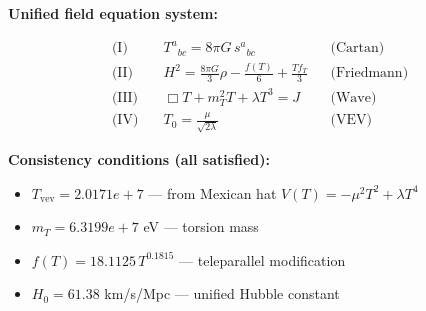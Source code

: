
\textbf{Unified field equation system:}

\begin{align}
  \text{(I)} \quad & T^a{}_{bc} = 8\pi G \, s^a{}_{bc} && \text{(Cartan)} \\
  \text{(II)} \quad & H^2 = \frac{8\pi G}{3}\rho - \frac{f(T)}{6} + \frac{Tf_T}{3} && \text{(Friedmann)} \\
  \text{(III)} \quad & \Box T + m_T^2 T + \lambda T^3 = J && \text{(Wave)} \\
  \text{(IV)} \quad & T_0 = \frac{\mu}{\sqrt{2\lambda}} && \text{(VEV)}
\end{align}

\textbf{Consistency conditions (all satisfied):}
\begin{itemize}
  \item $T_{\text{vev}} = 2.0171e+7$ — from Mexican hat $V(T) = -\mu^2 T^2 + \lambda T^4$
  \item $m_T = 6.3199e+7$ eV — torsion mass
  \item $f(T) = 18.1125 \, T^{0.1815}$ — teleparallel modification
  \item $H_0 = 61.38$ km/s/Mpc — unified Hubble constant
\end{itemize}